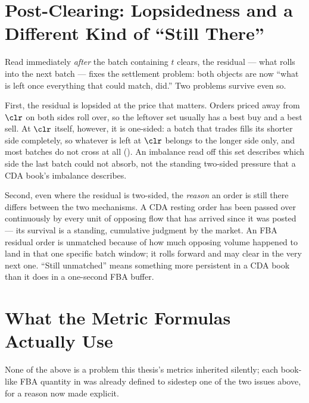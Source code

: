 \section{Post-Clearing: Lopsidedness and a Different Kind of ``Still There''}

Read immediately \emph{after} the batch containing $t$ clears, the
residual --- what rolls into the next batch --- fixes the settlement
problem: both objects are now ``what is left once everything that could
match, did.'' Two problems survive even so.

First, the residual is lopsided at the price that matters. Orders priced
away from $\clr$ on both sides roll over, so the leftover set usually has
a best buy and a best sell. At $\clr$ itself, however, it is one-sided: a
batch that trades fills its shorter side completely, so whatever is left
at $\clr$ belongs to the longer side only, and most batches do not cross
at all (). An imbalance read off this set describes which side the
last batch could not absorb, not the standing two-sided pressure that a
CDA book's imbalance describes.

Second, even where the residual is two-sided, the
\emph{reason} an order is still there differs between the two
mechanisms. A CDA resting order has been passed over continuously by
every unit of opposing flow that has arrived since it was posted --- its
survival is a standing, cumulative judgment by the market. An FBA
residual order is unmatched because of how much opposing volume happened
to land in that one specific batch window; it rolls forward and may
clear in the very next one. ``Still unmatched'' means something more
persistent in a CDA book than it does in a one-second FBA buffer.

\section{What the Metric Formulas Actually Use}

None of the above is a problem this thesis's metrics inherited silently;
each book-like FBA quantity in  was already defined to
sidestep one of the two issues above, for a reason now made explicit.


